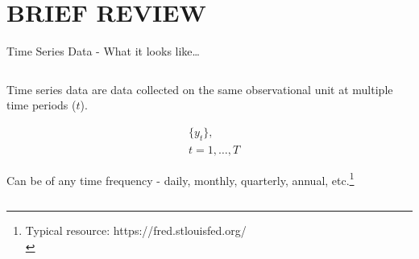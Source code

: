 \documentclass[
  10pt,
  ignorenonframetext,
]{beamer}
\begin{document}
\hypertarget{brief-review}{%
\section{BRIEF REVIEW}\label{brief-review}}

\begin{frame}{Time Series Data - What it looks like\ldots{}}
\protect\hypertarget{time-series-data---what-it-looks-like}{}
\begin{columns}[T]
\begin{column}{.5\textwidth}
\vspace{7mm}

\small

Time series data are data collected on the same observational unit at
multiple time periods (\(t\)).

\vspace{2mm}

\[
\begin{aligned}
&\{y_{t}\}, \\
&t = 1,\ldots, T
\end{aligned}
\]

\vspace{2mm}

Can be of any time frequency - daily, monthly, quarterly, annual,
etc.\footnote[frame]{Typical resource: https://fred.stlouisfed.org/ \\}
\end{column}


\end{columns}
\end{frame}
\end{document}
